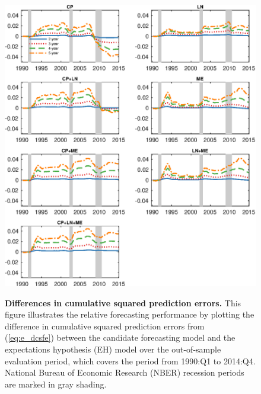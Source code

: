 \documentclass[12pt,a4paper,onecolumn,oneside,notitlepage]{article}
\begin{document}
\clearpage
\begin{figure}[htbp]
    \caption{
        \textbf{Differences in cumulative squared prediction errors.} \newline
        This figure illustrates the relative forecasting performance by plotting the difference in cumulative squared prediction errors from (\ref{eq:e_dcsfe}) between the candidate forecasting model and the expectations hypothesis (EH) model  over the out-of-sample evaluation period, which covers the period from 1990:Q1 to 2014:Q4. National Bureau of Economic Research (NBER) recession periods are marked in gray shading.
    }
    \centering
    \includegraphics[scale=1]{Figures/e_dcsfe.eps}
    \label{Fig:e_dcsfe}
\end{figure}
\end{document}
